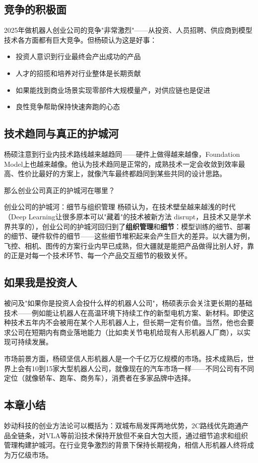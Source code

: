 \subsection{竞争的积极面}

2025年做机器人创业公司的竞争"非常激烈"——从投资、人员招聘、供应商到模型技术各方面都有巨大竞争。但杨硕认为这是好事：

\begin{itemize}
    \item 投资人意识到行业最终会产出成功的产品
    \item 人才的招揽和培养对行业整体是长期贡献
    \item 如果能找到商业场景实现零部件大规模量产，对供应链也是促进
    \item 良性竞争帮助保持快速奔跑的心态
\end{itemize}

\subsection{技术趋同与真正的护城河}

杨硕注意到行业内技术路线越来越趋同——硬件上做得越来越像，Foundation Model上也越来越像。他认为技术趋同是正常的，成熟技术一定会收敛到效率最高、性价比最好的方案上，就像汽车最终都趋同到某些共同的设计思路。

那么创业公司真正的护城河在哪里？

\begin{importantbox}{创业公司的护城河：细节与组织管理}
杨硕认为，在技术壁垒越来越浅的时代（Deep Learning让很多原本可以"藏着"的技术被新方法 disrupt，且技术又是学术界共享的），创业公司的护城河回归到了\textbf{组织管理}和\textbf{细节}：模型训练的细节、部署的细节、硬件软件的细节——这些细节堆积起来会产生巨大的差异。以大疆为例，飞控、相机、图传的方案行业内早已成熟，但大疆就是能把产品做得比别人好，靠的正是对每一个技术环节、每一个产品交互细节的极致关怀。
\end{importantbox}

\subsection{如果我是投资人}

被问及"如果你是投资人会投什么样的机器人公司"，杨硕表示会关注更长期的基础技术——例如能让机器人在高温环境下持续工作的新型电机方案、新材料。即使这种技术五年内不会被用在某个人形机器人上，但长期一定有价值。当然，他也会要求公司在短期内有商业落地能力（比如卖关节电机给现有人形机器人厂商），以实现可持续发展。

市场前景方面，杨硕坚信人形机器人是一个千亿万亿规模的市场。技术成熟后，世界上会有10到15家大型机器人公司，就像现在的汽车市场一样——不同公司有不同定位（就像轿车、跑车、商务车），消费者在多家品牌中选择。

\subsection{本章小结}

妙动科技的创业方法论可以概括为：双城布局发挥两地优势，2C路线优先跑通产品全链条，对VLA等前沿技术保持开放但不亲自大包大揽，通过细节追求和组织管理构建护城河。在行业竞争激烈的背景下保持长期视角，相信人形机器人终将成为万亿级市场。


